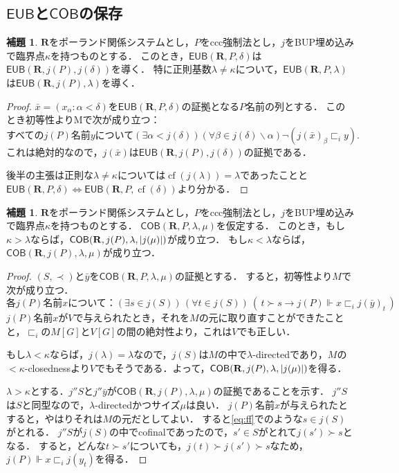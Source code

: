 \documentclass[uplatex,dvipdfmx]{jsarticle}
\newcommand\forces{\Vdash}
\newcommand{\cf}{\operatorname{cf}}
\newcommand{\EUB}{\mathsf{EUB}}
\newcommand{\COB}{\mathsf{COB}}
\newcommand{\relR}{\mathbf{R}}
\DeclarePairedDelimiter\abs{\lvert}{\rvert}
\renewcommand{\setminus}{\smallsetminus}
\theoremstyle{definition}
\newtheorem{lem}[thm]{補題}
\begin{document}
	\subsection{$\EUB$と$\COB$の保存}

	\begin{lem}
		$\relR$をポーランド関係システムとし，$P$をccc強制法とし，$j$をBUP埋め込みで臨界点$\kappa$を持つものとする．
		このとき，$\EUB(\relR, P, \delta)$は$\EUB(\relR, j(P), j(\delta))$を導く．
		特に正則基数$\lambda \ne \kappa$について，$\EUB(\relR, P, \lambda)$は$\EUB(\relR, j(P), \lambda)$を導く．
	\end{lem}
	\begin{proof}
		$\bar{x} = (x_\alpha : \alpha < \delta)$を$\EUB(\relR, P, \delta)$の証拠となる$P$名前の列とする．
		このとき初等性よりMで次が成り立つ：
		\[
			\text{すべての}j(P)\text{名前}y\text{について}(\exists \alpha < j(\delta))(\forall \beta \in j(\delta) \setminus \alpha) \neg(j(\bar{x})_\beta \sqsubset_i 	y).
		\]
		これは絶対的なので，$j(\bar{x})$は$\EUB(\relR, j(P), j(\delta))$の証拠である．

		後半の主張は正則な$\lambda \ne \kappa$については$\cf(j(\lambda)) = \lambda$であったことと$\EUB(\relR, P, \delta) \iff \EUB(\relR, P, \cf(\delta))$より分かる．
	\end{proof}
	
	\begin{lem}
	$\relR$をポーランド関係システムとし，$P$をccc強制法とし，$j$をBUP埋め込みで臨界点$\kappa$を持つものとする．
	$\COB(\relR, P, \lambda, \mu)$を仮定する．
	このとき，もし$\kappa > \lambda$ならば，$\COB(\relR, j(P), \lambda, \abs{j(\mu)})$が成り立つ．
	もし$\kappa < \lambda$ならば，$\COB(\relR, j(P), \lambda, \mu)$が成り立つ．	
	\end{lem}
	\begin{proof}
		$(S, \prec)$と$\bar{y}$を$\COB(\relR, P, \lambda, \mu)$の証拠とする．
		すると，初等性より$M$で次が成り立つ．
		\begin{equation}\tag{$*$}\label{eq:ff}
		\text{各$j(P)$名前$x$について：}
		(\exists s\in j(S))\,(\forall t\in j(S))\ (\, t\succ s\rightarrow  j(P)\forces 
		x \sqsubset_i j(\bar{y})_t\,)
		\end{equation}
		$j(P)$名前$x$が$V$で与えられたとき，それを$M$の元に取り直すことができたことと，$\sqsubset_i$の$M[G]$と$V[G]$の間の絶対性より，これは$V$でも正しい．
		
		もし$\lambda < \kappa$ならば，$j(\lambda) = \lambda$なので，$j(S)$は$M$の中で$\lambda$-directedであり，$M$の${<}\kappa$-closednessより$V$でもそうである．よって，$\COB(\relR, j(P), \lambda, \abs{j(\mu)})$を得る．
		
		$\lambda > \kappa$とする．$j''S$と$j''\bar{y}$が$\COB(\relR, j(P), \lambda, \mu)$の証拠であることを示す．
		$j''S$は$S$と同型なので，$\lambda$-directedかつサイズ$\mu$は良い．
		$j(P)$名前$x$が与えられたとすると，やはりそれは$M$の元だとしてよい．
		すると\eqref{eq:ff}でのような$s \in j(S)$がとれる．
		$j''S$が$j(S)$の中でcofinalであったので，$s' \in S$がとれて$j(s') \succ s$となる．
		すると，どんな$t \succ s'$についても，$j(t) \succ j(s') \succ s$なため，$j(P) \forces x \sqsubset_i j(y_t)$を得る．
	\end{proof}
		
\end{document}
